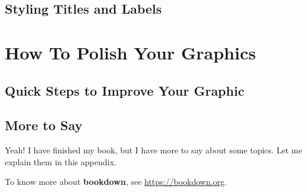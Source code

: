 \documentclass[
]{krantz}
\begin{document}
\hypertarget{styling-titles-and-labels}{%
\chapter{Styling Titles and Labels}\label{styling-titles-and-labels}}

\hypertarget{part-how-to-polish-your-graphics}{%
\part{How To Polish Your Graphics}\label{part-how-to-polish-your-graphics}}

\hypertarget{polish}{%
\chapter{Quick Steps to Improve Your Graphic}\label{polish}}

\cleardoublepage

\hypertarget{appendix-appendix}{%
\appendix {}}


\hypertarget{more-to-say}{%
\chapter{More to Say}\label{more-to-say}}

Yeah! I have finished my book, but I have more to say about some topics. Let me explain them in this appendix.

To know more about \textbf{bookdown}, see \url{https://bookdown.org}.

  

\backmatter
\printindex
\end{document}
